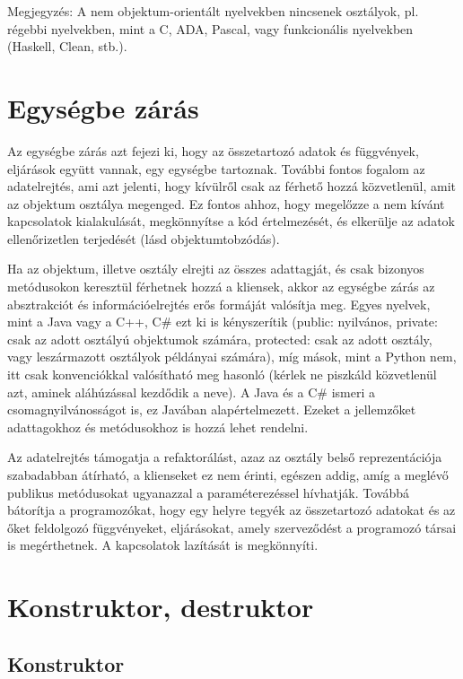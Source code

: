 \documentclass[margin=0px]{article}
\begin{document}
Megjegyzés: A nem objektum-orientált nyelvekben nincsenek osztályok, pl. régebbi nyelvekben, mint a C, ADA, Pascal, vagy
funkcionális nyelvekben (Haskell, Clean, stb.).

\section{Egységbe zárás}
Az egységbe zárás azt fejezi ki, hogy az összetartozó adatok és függvények, eljárások együtt vannak, egy egységbe tartoznak. További fontos fogalom az adatelrejtés, ami azt jelenti, hogy kívülről csak az férhető hozzá közvetlenül, amit az objektum osztálya megenged. Ez fontos ahhoz, hogy megelőzze a nem kívánt kapcsolatok kialakulását, megkönnyítse a kód értelmezését, és elkerülje az adatok ellenőrizetlen terjedését (lásd objektumtobzódás).

Ha az objektum, illetve osztály elrejti az összes adattagját, és csak bizonyos metódusokon keresztül férhetnek hozzá a kliensek, akkor az egységbe zárás az absztrakciót és információelrejtés erős formáját valósítja meg. Egyes nyelvek, mint a Java vagy a C++, C\# ezt ki is kényszerítik (public: nyilvános, private: csak az adott osztályú objektumok számára, protected: csak az adott osztály, vagy leszármazott osztályok példányai számára), míg mások, mint a Python nem, itt csak konvenciókkal valósítható meg hasonló (kérlek ne piszkáld közvetlenül azt, aminek aláhúzással kezdődik a neve). A Java és a C\# ismeri a csomagnyilvánosságot is, ez Javában alapértelmezett. Ezeket a jellemzőket adattagokhoz és metódusokhoz is hozzá lehet rendelni.

Az adatelrejtés támogatja a refaktorálást, azaz az osztály belső reprezentációja szabadabban átírható, a klienseket ez nem érinti, egészen addig, amíg a meglévő publikus metódusokat ugyanazzal a paraméterezéssel hívhatják. Továbbá bátorítja a programozókat, hogy egy helyre tegyék az összetartozó adatokat és az őket feldolgozó függvényeket, eljárásokat, amely szerveződést a programozó társai is megérthetnek. A kapcsolatok lazítását is megkönnyíti.

\section{Konstruktor, destruktor}

\subsection{Konstruktor}
\end{document}
